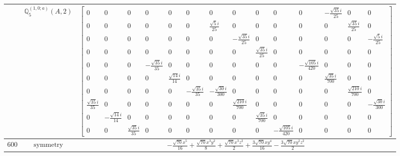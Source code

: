 \documentclass[fleqn,8pt,landscape]{jsarticle}
\begin{document}
\begin{longtable}{ccc}
$  $ & $ \mathbb{Q}_{5}^{(1,0;a)}(A,2) $ & $ \begin{bmatrix} 0 & 0 & 0 & 0 & 0 & 0 & 0 & 0 & 0 & 0 & 0 & - \frac{\sqrt{35} i}{25} & 0 & 0 \\ 0 & 0 & 0 & 0 & 0 & 0 & \frac{\sqrt{5} i}{25} & 0 & 0 & 0 & 0 & 0 & \frac{\sqrt{35} i}{25} & 0 \\ 0 & 0 & 0 & 0 & 0 & 0 & 0 & - \frac{\sqrt{35} i}{25} & 0 & 0 & 0 & 0 & 0 & - \frac{\sqrt{5} i}{25} \\ 0 & 0 & 0 & 0 & 0 & 0 & 0 & 0 & \frac{\sqrt{35} i}{25} & 0 & 0 & 0 & 0 & 0 \\ 0 & 0 & 0 & - \frac{\sqrt{35} i}{35} & 0 & 0 & 0 & 0 & 0 & 0 & - \frac{\sqrt{105} i}{420} & 0 & 0 & 0 \\ 0 & 0 & 0 & 0 & \frac{\sqrt{14} i}{14} & 0 & 0 & 0 & 0 & 0 & 0 & \frac{\sqrt{35} i}{700} & 0 & 0 \\ 0 & 0 & 0 & 0 & 0 & - \frac{\sqrt{35} i}{35} & - \frac{\sqrt{30} i}{300} & 0 & 0 & 0 & 0 & 0 & \frac{\sqrt{210} i}{700} & 0 \\ \frac{\sqrt{35} i}{35} & 0 & 0 & 0 & 0 & 0 & 0 & \frac{\sqrt{210} i}{700} & 0 & 0 & 0 & 0 & 0 & - \frac{\sqrt{30} i}{300} \\ 0 & - \frac{\sqrt{14} i}{14} & 0 & 0 & 0 & 0 & 0 & 0 & \frac{\sqrt{35} i}{700} & 0 & 0 & 0 & 0 & 0 \\ 0 & 0 & \frac{\sqrt{35} i}{35} & 0 & 0 & 0 & 0 & 0 & 0 & - \frac{\sqrt{105} i}{420} & 0 & 0 & 0 & 0 \end{bmatrix} $ \\ \hline
$ 600 $ & $ \text{symmetry} $ & $ - \frac{\sqrt{70} x^{5}}{16} + \frac{\sqrt{70} x^{3} y^{2}}{8} + \frac{\sqrt{70} x^{3} z^{2}}{2} + \frac{3 \sqrt{70} x y^{4}}{16} - \frac{3 \sqrt{70} x y^{2} z^{2}}{2} $ \\

\end{longtable}
\end{document}
